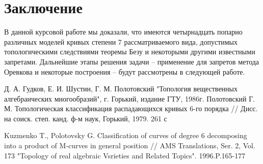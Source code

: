 \documentclass[14pt]{article}
\begin{document}
\newpage
\section{Заключение}
В данной курсовой работе мы доказали, что имеются четырнадцать попарно различных моделей кривых степени 7 рассматриваемого вида, допустимых топологическими следствиями теоремы Безу и некоторыми другими известными запретами. Дальнейшие этапы решения задачи -- применение для запретов метода Оревкова и некоторые построения -- будут рассмотрены в следующей работе.

\newpage
{}
\begin{thebibliography}{}
 Д. А. Гудков, Е. И. Шустин, Г. М. Полотовский "Топология вещественных алгебраических многообразий", г. Горький, издание ГТУ, 1986г.
Полотовский Г. М. Топологическая классификация распадающихся кривых 6-го порядка // Дисс. на соиск. степ. канд. ф-м наук, Горький, 1979. 261 с

Kuzmenko T., Polotovsky G. Classification of curves of degree 6 decomposing into a product of M-curves in general position // AMS Translations, Ser. 2, Vol. 173 "Topology of real algebraic Vsrieties and Related Topics". 1996.P.165-177

\end{thebibliography}


\makeatother
\end{document}
